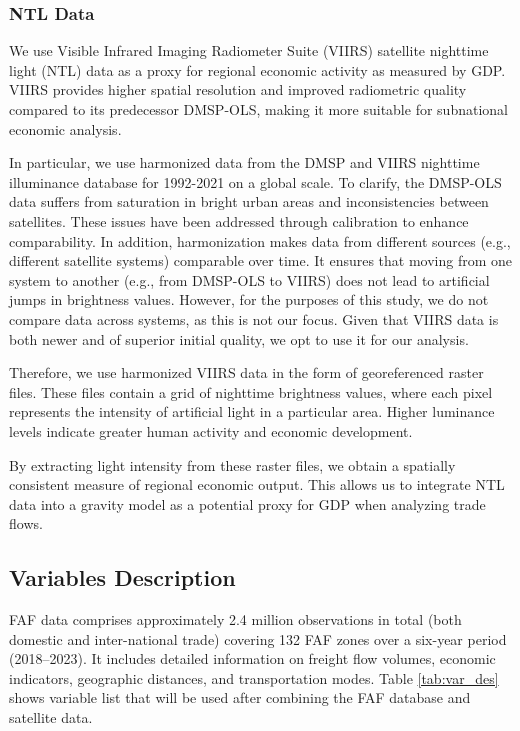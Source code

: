 \subsubsection{NTL Data}

We use Visible Infrared Imaging Radiometer Suite (VIIRS) satellite nighttime light (NTL) data as a proxy for regional economic activity as measured by GDP. VIIRS provides higher spatial resolution and improved radiometric quality compared to its predecessor DMSP-OLS, making it more suitable for subnational economic analysis.

In particular, we use harmonized data from the DMSP and VIIRS nighttime illuminance database for 1992-2021 on a global scale. To clarify, the DMSP-OLS data suffers from saturation in bright urban areas and inconsistencies between satellites. These issues have been addressed through calibration to enhance comparability. In addition, harmonization makes data from different sources (e.g., different satellite systems) comparable over time. It ensures that moving from one system to another (e.g., from DMSP-OLS to VIIRS) does not lead to artificial jumps in brightness values. However, for the purposes of this study, we do not compare data across systems, as this is not our focus. Given that VIIRS data is both newer and of superior initial quality, we opt to use it for our analysis.

Therefore, we use harmonized VIIRS data in the form of georeferenced raster files. These files contain a grid of nighttime brightness values, where each pixel represents the intensity of artificial light in a particular area. Higher luminance levels indicate greater human activity and economic development.

By extracting light intensity from these raster files, we obtain a spatially consistent measure of regional economic output. This allows us to integrate NTL data into a gravity model as a potential proxy for GDP when analyzing trade flows.

\subsection{Variables Description}

FAF data comprises approximately 2.4 million observations in total (both domestic and inter-national trade) covering 132 FAF zones over a six-year period (2018–2023). It includes detailed information on freight flow volumes, economic indicators, geographic distances, and transportation modes. Table \ref{tab:var_des} shows variable list that will be used after combining the FAF database and satellite data.

